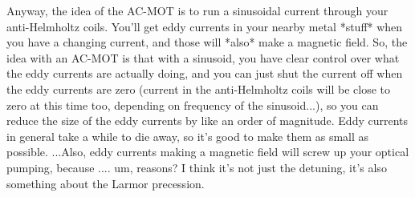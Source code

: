 Anyway, the idea of the AC-MOT is to run a sinusoidal current through your anti-Helmholtz coils.  You'll get eddy currents in your nearby metal *stuff* when you have a changing current, and those will *also* make a magnetic field. So, the idea with an AC-MOT is that with a sinusoid, you have clear control over what the eddy currents are actually doing, and you can just shut the current off when the eddy currents are zero (current in the anti-Helmholtz coils will be close to zero at this time too, depending on frequency of the sinusoid...), so you can reduce the size of the eddy currents by like an order of magnitude.  Eddy currents in general take a while to die away, so it's good to make them as small as possible.  ...Also, eddy currents making a magnetic field will screw up your optical pumping, because .... um, reasons?  I think it's not just the detuning, it's also something about the Larmor precession.  


